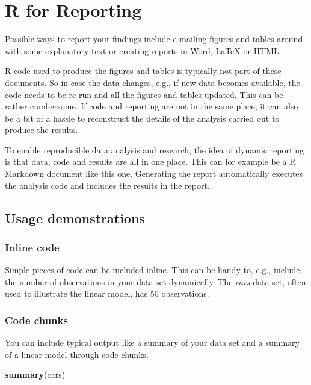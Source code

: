 \documentclass[]{book}
\newenvironment{Shaded}{\begin{snugshade}}{\end{snugshade}}
\newcommand{\KeywordTok}[1]{\textcolor[rgb]{0.13,0.29,0.53}{\textbf{#1}}}
\newcommand{\NormalTok}[1]{#1}
\begin{document}
\hypertarget{r-for-reporting}{%
\chapter{R for Reporting}\label{r-for-reporting}}

Possible ways to report your findings include e-mailing figures and tables around with some explanatory text or creating reports in Word, LaTeX or HTML.

R code used to produce the figures and tables is typically not part of these documents. So in case the data changes, e.g., if new data becomes available, the code needs to be re-run and all the figures and tables updated. This can be rather cumbersome. If code and reporting are not in the same place, it can also be a bit of a hassle to reconstruct the details of the analysis carried out to produce the results.

To enable reproducible data analysis and research, the idea of dynamic reporting is that data, code and results are all in one place. This can for example be a R Markdown document like this one. Generating the report automatically executes the analysis code and includes the results in the report.

\hypertarget{usage-demonstrations}{%
\section{Usage demonstrations}\label{usage-demonstrations}}

\hypertarget{inline-code}{%
\subsection{Inline code}\label{inline-code}}

Simple pieces of code can be included inline. This can be handy to, e.g., include the number of observations in your data set dynamically. The \emph{cars} data set, often used to illustrate the linear model, has 50 observations.

\hypertarget{code-chunks}{%
\subsection{Code chunks}\label{code-chunks}}

You can include typical output like a summary of your data set and a summary of a linear model through code chunks.

\begin{Shaded}
\begin{Highlighting}[]
\KeywordTok{summary}\NormalTok{(cars)}
\end{Highlighting}
\end{Shaded}
\end{document}
